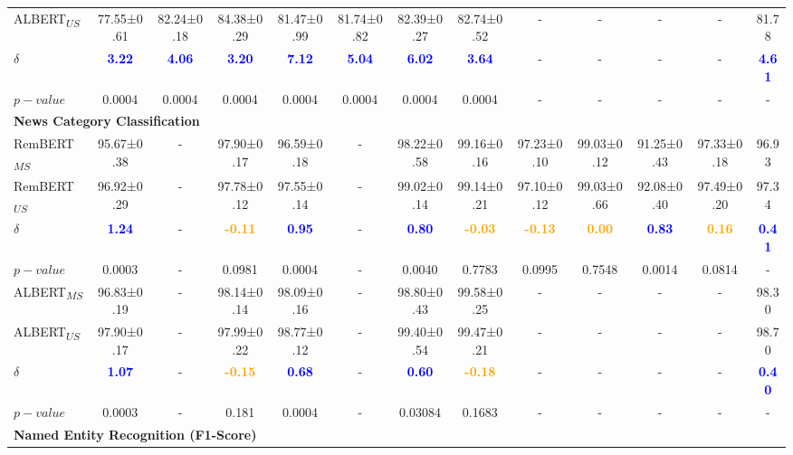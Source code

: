 \documentclass[11pt]{article}
\begin{document}
\begin{table*}[hbt!]
\begin{adjustbox}{max width=\textwidth}
\begin{tabular}{l c c c c c c c c c c c c}
ALBERT\textsubscript{$US$}   & 77.55±0.61 & 82.24±0.18 & 84.38±0.29 & 81.47±0.99 & 81.74±0.82 & 82.39±0.27 & 82.74±0.52 & - &- & - & - & 81.78 \\
$\delta$ & \textcolor{blue}{\textbf{3.22}} & \textcolor{blue}{\textbf{4.06}} & \textcolor{blue}{\textbf{3.20}} & \textcolor{blue}{\textbf{7.12}} & \textcolor{blue}{\textbf{5.04}} & \textcolor{blue}{\textbf{6.02}} & \textcolor{blue}{\textbf{3.64}} & - & - & - & - & \textcolor{blue}{\textbf{4.61}}\\
$p-value$ &0.0004	&0.0004	&0.0004	&0.0004	&0.0004	&0.0004	&0.0004 &- &- & - & - & - \\
\midrule[2pt]
\multicolumn{13}{l}{\textbf{News Category Classification}}\\
RemBERT\textsubscript{$MS$}  & 95.67±0.38 & - & 97.90±0.17 & 96.59±0.18 & - & 98.22±0.58 & 99.16±0.16 & 97.23±0.10 & 99.03±0.12 & 91.25±0.43 & 97.33±0.18 & 96.93 \\
RemBERT\textsubscript{$US$}  & 96.92±0.29 & - & 97.78±0.12 & 97.55±0.14 & - & 99.02±0.14 & 99.14±0.21 & 97.10±0.12 & 99.03±0.66 & 92.08±0.40 & 97.49±0.20 & 97.34 \\
$\delta$ & \textcolor{blue}{\textbf{1.24}} & - & \textcolor{orange}{\textbf{-0.11}} & \textcolor{blue}{\textbf{0.95}} & - & \textcolor{blue}{\textbf{0.80}} & \textcolor{orange}{\textbf{-0.03}} &  \textcolor{orange}{\textbf{-0.13}} & \textcolor{orange}{\textbf{0.00}} & \textcolor{blue}{\textbf{0.83}} & \textcolor{orange}{\textbf{0.16}} & \textcolor{blue}{\textbf{0.41}}\\
$p-value$ & 0.0003	& - & 0.0981 & 0.0004 & - & 0.0040 & 0.7783	& 0.0995 & 0.7548 & 0.0014 & 0.0814 & - \\
\midrule[1pt]
ALBERT\textsubscript{$MS$}            & 96.83±0.19 & - & 98.14±0.14 & 98.09±0.16 & - & 98.80±0.43 & 99.58±0.25 & - &- & - & - & 98.30\\
ALBERT\textsubscript{$US$}   & 97.90±0.17 & - & 97.99±0.22 & 98.77±0.12 & - & 99.40±0.54 & 99.47±0.21 & - &- & - & - & 98.70\\
$\delta$ & \textcolor{blue}{\textbf{1.07}} & - & \textcolor{orange}{\textbf{-0.15}} & \textcolor{blue}{\textbf{0.68}} & - & \textcolor{blue}{\textbf{0.60}} & \textcolor{orange}{\textbf{-0.18}} & - & - & - & - & \textcolor{blue}{\textbf{0.40}}\\
$p-value$ &0.0003	&-	&0.181	&0.0004	&-	&0.03084 &0.1683 &- &- & - & - & -\\
\midrule[2pt]
\multicolumn{13}{l}{\textbf{\textbf{Named Entity Recognition (F1-Score)}}}\\

\end{tabular}
\end{adjustbox}
\end{table*}
\end{document}
